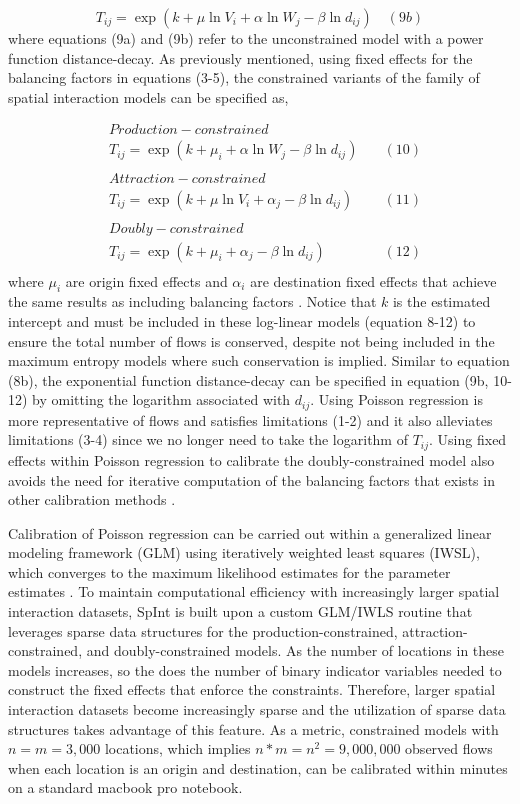 \documentclass[11pt]{article}
\begin{document}
\[T_{ij} = \exp(k + \mu \ln V_{i} + \alpha \ln W_{j} - \beta \ln d_{ij}) \quad (9b) \]
%
where equations (9a) and (9b) refer to the unconstrained model with a
power function distance-decay. As previously mentioned, using fixed
effects for the balancing factors in equations (3-5), the constrained
variants of the family of spatial interaction models can be specified
as,

\[
\begin{align}
&Production-constrained \\
&T_{ij} = \exp(k + \mu_{i} + \alpha \ln W_{j} - \beta \ln d_{ij}) \quad & (10) \\
\\
&Attraction-constrained \\
&T_{ij} = \exp(k + \mu \ln V_{i} + \alpha_{j} - \beta \ln d_{ij}) \quad & (11) \\
\\
&Doubly-constrained \\
&T_{ij} = \exp(k + \mu_{i} + \alpha_{j} - \beta \ln d_{ij}) \quad & (12) \\
\end{align}
\]
%
where \(\mu_{i}\) are origin fixed effects and \(\alpha_{i}\) are
destination fixed effects that achieve the same results as including
balancing factors \citep{tiefelsdorf_specification_1995}. Notice that $k$ is the estimated intercept and must be included in these log-linear models (equation 8-12) to ensure the total number of flows is conserved, despite not being included in the maximum entropy models where such conservation is implied. Similar to equation (8b), the exponential function
distance-decay can be specified in equation (9b, 10-12) by omitting the
logarithm associated with \(d_{ij}\). Using Poisson regression is more
representative of flows and satisfies limitations (1-2) and it also
alleviates limitations (3-4) since we no longer need to take the
logarithm of \(T_{ij}\). Using fixed effects within Poisson regression
to calibrate the doubly-constrained model also avoids the need for
iterative computation of the balancing factors that exists in other
calibration methods \citep{fotheringham_spatial_1989}.

Calibration of Poisson regression can be carried out within a
generalized linear modeling framework (GLM) using iteratively weighted
least squares (IWSL), which converges to the maximum likelihood
estimates for the parameter estimates \citep{nelder_generalized_1972}. To
maintain computational efficiency with increasingly larger spatial
interaction datasets, SpInt is built upon a custom GLM/IWLS routine that
leverages sparse data structures for the production-constrained,
attraction-constrained, and doubly-constrained models. As the number of
locations in these models increases, so the does the number of binary
indicator variables needed to construct the fixed effects that enforce
the constraints. Therefore, larger spatial interaction datasets become
increasingly sparse and the utilization of sparse data structures takes
advantage of this feature. As a metric, constrained models with
\(n = m = 3,000\) locations, which implies \(n*m = n^2 = 9,000,000\)
observed flows when each location is an origin and destination, can be
calibrated within minutes on a standard macbook pro notebook.
\end{document}
